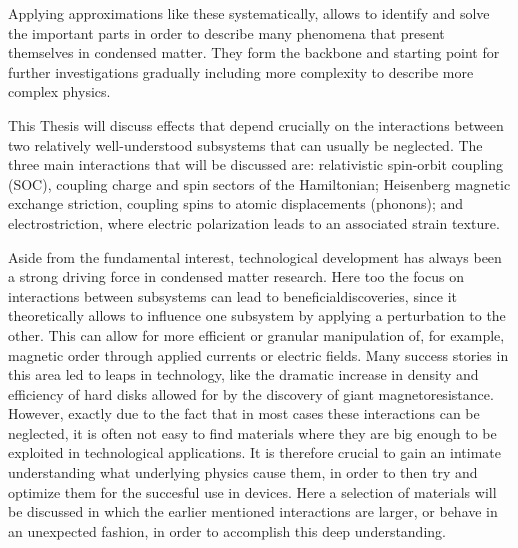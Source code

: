 Applying approximations like these systematically, allows to identify and solve the important parts in order to describe many phenomena that present themselves in condensed matter.
They form the backbone and starting point for further investigations gradually including more complexity to describe more complex physics.

This Thesis will discuss effects that depend crucially on the interactions between two relatively well-understood subsystems that can usually be neglected.
The three main interactions that will be discussed are: relativistic spin-orbit coupling (SOC), coupling charge and spin sectors of the Hamiltonian; Heisenberg magnetic exchange striction, coupling spins to atomic displacements (phonons); and electrostriction, where electric polarization leads to an associated strain texture.

Aside from the fundamental interest, technological development has always been a strong driving force in condensed matter research. Here too the focus on interactions between subsystems can lead to beneficialdiscoveries, since it theoretically allows to influence one subsystem by applying a perturbation to the other.
This can allow for more efficient or granular manipulation of, for example, magnetic order through applied currents or electric fields.
Many success stories in this area led to leaps in technology, like the dramatic increase in density and efficiency of hard disks allowed for by the discovery of giant magnetoresistance.
However, exactly due to the fact that in most cases these interactions can be neglected, it is often not easy to find materials where they are big enough to be exploited in technological applications.
It is therefore crucial to gain an intimate understanding what underlying physics cause them, in order to then try and optimize them for the succesful use in devices.
Here a selection of materials will be discussed in which the earlier mentioned interactions are larger, or behave in an unexpected fashion, in order to accomplish this deep understanding.

